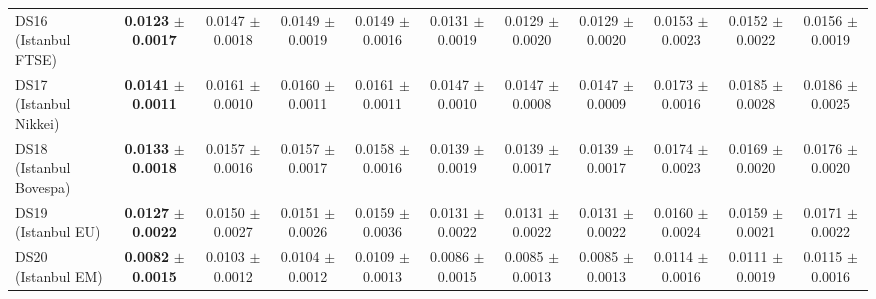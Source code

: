 \begin{table}[t]
{{\begin{tabular}{lcccccccccc}
DS16 (Istanbul FTSE) & \textbf{0.0123} $\pm$ \textbf{0.0017} & 0.0147 $\pm$ 0.0018 & 0.0149 $\pm$ 0.0019 & 0.0149 $\pm$ 0.0016 & 0.0131 $\pm$ 0.0019 & 0.0129 $\pm$ 0.0020 & 0.0129 $\pm$ 0.0020 & 0.0153 $\pm$ 0.0023 & 0.0152 $\pm$ 0.0022 & 0.0156 $\pm$ 0.0019 \\
DS17 (Istanbul Nikkei) & \textbf{0.0141} $\pm$ \textbf{0.0011} & 0.0161 $\pm$ 0.0010 & 0.0160 $\pm$ 0.0011 & 0.0161 $\pm$ 0.0011 & 0.0147 $\pm$ 0.0010 & 0.0147 $\pm$ 0.0008 & 0.0147 $\pm$ 0.0009 & 0.0173 $\pm$ 0.0016 & 0.0185 $\pm$ 0.0028 & 0.0186 $\pm$ 0.0025 \\
DS18 (Istanbul Bovespa) & \textbf{0.0133} $\pm$ \textbf{0.0018} & 0.0157 $\pm$ 0.0016 & 0.0157 $\pm$ 0.0017 & 0.0158 $\pm$ 0.0016 & 0.0139 $\pm$ 0.0019 & 0.0139 $\pm$ 0.0017 & 0.0139 $\pm$ 0.0017 & 0.0174 $\pm$ 0.0023 & 0.0169 $\pm$ 0.0020 & 0.0176 $\pm$ 0.0020 \\
DS19 (Istanbul EU) & \textbf{0.0127} $\pm$ \textbf{0.0022} & 0.0150 $\pm$ 0.0027 & 0.0151 $\pm$ 0.0026 & 0.0159 $\pm$ 0.0036 & 0.0131 $\pm$ 0.0022 & 0.0131 $\pm$ 0.0022 & 0.0131 $\pm$ 0.0022 & 0.0160 $\pm$ 0.0024 & 0.0159 $\pm$ 0.0021 & 0.0171 $\pm$ 0.0022 \\
DS20 (Istanbul EM) & \textbf{0.0082} $\pm$ \textbf{0.0015} & 0.0103 $\pm$ 0.0012 & 0.0104 $\pm$ 0.0012 & 0.0109 $\pm$ 0.0013 & 0.0086 $\pm$ 0.0015 & 0.0085 $\pm$ 0.0013 & 0.0085 $\pm$ 0.0013 & 0.0114 $\pm$ 0.0016 & 0.0111 $\pm$ 0.0019 & 0.0115 $\pm$ 0.0016 \\
\bottomrule
\end{tabular}%
}%
}
\end{table}
